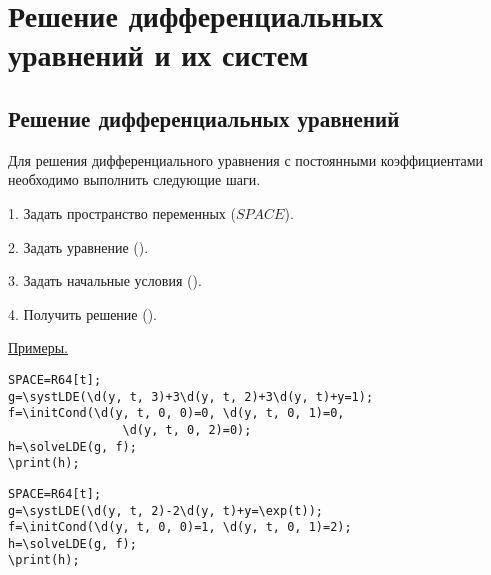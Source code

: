 \chapter{Решение дифференциальных уравнений и их систем}

\section{Решение дифференциальных уравнений}
Для решения дифференциального уравнения с постоянными коэффициентами необходимо выполнить следующие шаги.


1. Задать пространство переменных ($SPACE$). 

2. Задать уравнение (). 

3. Задать начальные условия (). 

4. Получить решение (). 


\underline{Примеры. }

\vspace*{-2mm}

\begin{verbatim}
SPACE=R64[t]; 
g=\systLDE(\d(y, t, 3)+3\d(y, t, 2)+3\d(y, t)+y=1);
f=\initCond(\d(y, t, 0, 0)=0, \d(y, t, 0, 1)=0, 
                \d(y, t, 0, 2)=0);
h=\solveLDE(g, f);
\print(h);
\end{verbatim}


\begin{verbatim}
SPACE=R64[t]; 
g=\systLDE(\d(y, t, 2)-2\d(y, t)+y=\exp(t));
f=\initCond(\d(y, t, 0, 0)=1, \d(y, t, 0, 1)=2);
h=\solveLDE(g, f);
\print(h);
\end{verbatim}

